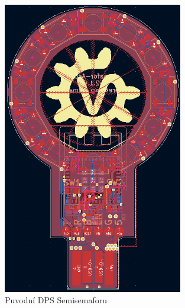 \begin{figure}[!h]
  \begin{center}
    \includegraphics[width=0.7\textwidth]{text/PraktickaCast/img/SemiSemafor-PCB-V1.png}
  \end{center}
  \label{semisemafor-pcb-v1}
    \caption{Puvodní DPS Semisemaforu}
\end{figure}

